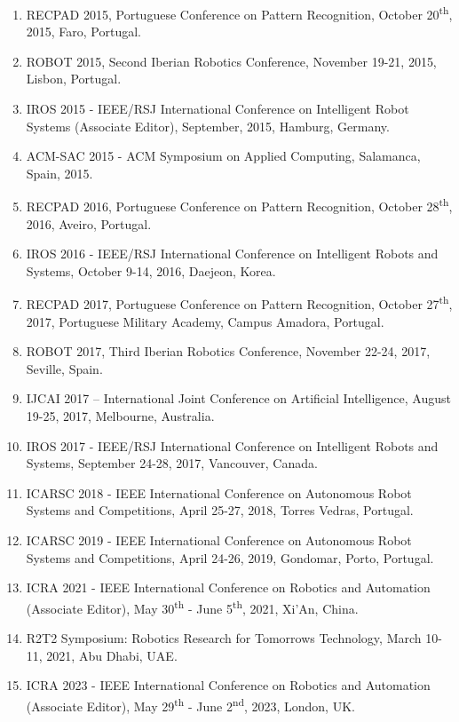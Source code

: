 \begin{enumerate}
  VISART II Workshop @ ECCV 2014 - "Where Computer Vision Meets Art"
  Workshop, Zurich, Switzerland, September 2014.
\item
  RECPAD 2015, Portuguese Conference on Pattern Recognition, October
  20\textsuperscript{th}, 2015, Faro, Portugal.
\item
  ROBOT 2015, Second Iberian Robotics Conference, November 19-21, 2015,
  Lisbon, Portugal.
\item
  IROS 2015 - IEEE/RSJ International Conference on Intelligent Robot
  Systems (Associate Editor), September, 2015, Hamburg, Germany.
\item
  ACM-SAC 2015 - ACM Symposium on Applied Computing, Salamanca, Spain,
  2015.
\item
  RECPAD 2016, Portuguese Conference on Pattern Recognition, October
  28\textsuperscript{th}, 2016, Aveiro, Portugal.
\item
  IROS 2016 - IEEE/RSJ International Conference on Intelligent Robots
  and Systems, October 9-14, 2016, Daejeon, Korea.
\item
  RECPAD 2017, Portuguese Conference on Pattern Recognition, October
  27\textsuperscript{th}, 2017, Portuguese Military Academy, Campus
  Amadora, Portugal.
\item
  ROBOT 2017, Third Iberian Robotics Conference, November 22-24, 2017,
  Seville, Spain.
\item
  IJCAI 2017 -- International Joint Conference on Artificial
  Intelligence, August 19-25, 2017, Melbourne, Australia.
\item
  IROS 2017 - IEEE/RSJ International Conference on Intelligent Robots
  and Systems, September 24-28, 2017, Vancouver, Canada.
\item
  ICARSC 2018 - IEEE International Conference on Autonomous Robot
  Systems and Competitions, April 25-27, 2018, Torres Vedras, Portugal.
\item
  ICARSC 2019 - IEEE International Conference on Autonomous Robot
  Systems and Competitions, April 24-26, 2019, Gondomar, Porto,
  Portugal.
\item
  ICRA 2021 - IEEE International Conference on Robotics and Automation
  (Associate Editor), May 30\textsuperscript{th} - June
  5\textsuperscript{th}, 2021, Xi'An, China.
\item
  R2T2 Symposium: Robotics Research for Tomorrow\textquotesingle s
  Technology, March 10-11, 2021, Abu Dhabi, UAE.
\item
  ICRA 2023 - IEEE International Conference on Robotics and Automation
  (Associate Editor), May 29\textsuperscript{th} - June
  2\textsuperscript{nd}, 2023, London, UK.
\end{enumerate}

